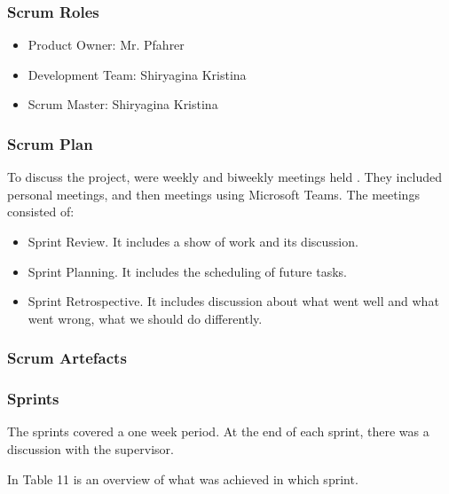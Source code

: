 \documentclass{scrartcl}
\begin{document}
 	    
 	    
  		\subsubsection{Scrum Roles}
  		\begin{itemize}
  		\item Product Owner: Mr. Pfahrer
  		\item Development Team: Shiryagina Kristina
  		\item Scrum Master: Shiryagina Kristina
  		
  		\end{itemize}
  	    \subsubsection{Scrum Plan}
  	    To discuss the project, were weekly and biweekly meetings held . They included personal meetings, and then meetings using Microsoft Teams. The meetings consisted of:
  	    \begin{itemize}
  	    \item Sprint Review. It includes a show of work and its discussion.
  	    \item Sprint Planning. It includes the scheduling of future tasks.
  	    \item Sprint Retrospective. It includes discussion about what went well and what went wrong, what we should do differently. 
  	    \end{itemize}
  		\subsubsection{Scrum Artefacts }
  		
  		\subsubsection{Sprints}
  		
	The sprints covered a one week period. At the end of each sprint, there was a discussion with the supervisor.

In Table 11 is an overview of what was achieved in which sprint.
\end{document}
